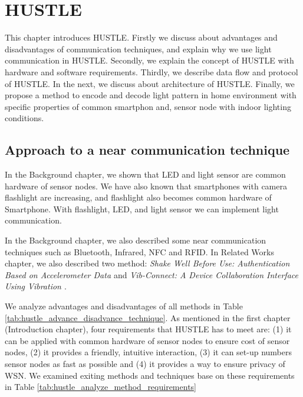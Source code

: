\chapter{HUSTLE}\label{chap:hustle}
This chapter introduces HUSTLE. Firstly we discuss about advantages and disadvantages of communication techniques, and explain why we use light communication in HUSTLE. Secondly, we explain the concept of HUSTLE with hardware and software requirements. Thirdly, we describe data flow and protocol of HUSTLE. In the next, we discuss about architecture of HUSTLE. Finally, we propose a method to encode and decode light pattern in home environment with specific properties of common smartphon and, sensor node with indoor lighting conditions.

\clearpage
\section{Approach to a near communication technique}

In the Background chapter, we shown that LED and light sensor are common hardware of sensor nodes. We have also known that smartphones with camera flashlight are increasing, and flashlight also becomes common hardware of Smartphone. With flashlight, LED, and light sensor we can implement light communication.%

In the Background chapter, we also described some near communication techniques such as Bluetooth, Infrared, NFC and RFID. In Related Works chapter, we also described two method: \emph{Shake Well Before Use: Authentication Based on Accelerometer Data \cite{Mayrhofer:2007:SWB:1758156.1758168}} and \emph{Vib-Connect: A Device Collaboration Interface Using Vibration \cite{vibconnect}}. 

We analyze advantages and disadvantages of all methods in Table \ref{tab:hustle_advance_disadvance_technique}. As mentioned in the first chapter (Introduction chapter), four requirements that HUSTLE has to meet are: (1) it can be applied with common hardware of sensor nodes to ensure cost of sensor nodes, (2) it provides a friendly, intuitive interaction, (3) it can set-up numbers sensor nodes as fast as possible and (4) it provides a way to ensure privacy of WSN. We examined exiting methods and techniques base on these requirements in Table \ref{tab:hustle_analyze_method_requirements}

